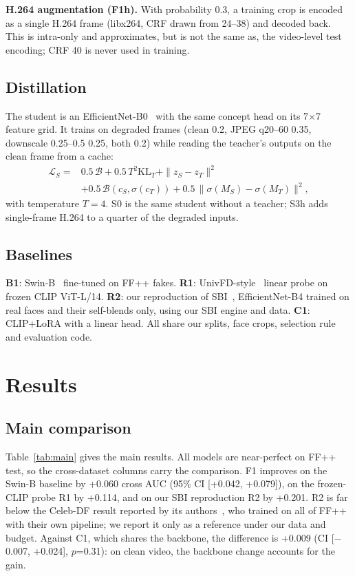 \documentclass[conference]{IEEEtran}
\begin{document}
\textbf{H.264 augmentation (F1h).} With probability 0.3, a training crop is encoded as a single H.264 frame
(libx264, CRF drawn from 24--38) and decoded back. This is intra-only and approximates, but is not the same as, the
video-level test encoding; CRF 40 is never used in training.

\subsection{Distillation}
The student is an EfficientNet-B0~\cite{efficientnet} with the same concept head on its 7$\times$7 feature grid. It
trains on degraded frames (clean 0.2, JPEG q20--60 0.35, downscale 0.25--0.5 0.25, both 0.2) while reading the
teacher's outputs on the clean frame from a cache:
\begin{align}
\mathcal{L}_S = {} & 0.5\,\mathcal{B} + 0.5\,T^2\mathrm{KL}_T + \|z_S-z_T\|^2 \nonumber\\
& + 0.5\,\mathcal{B}(c_S,\sigma(c_T)) + 0.5\,\|\sigma(M_S)-\sigma(M_T)\|^2,
\end{align}
with temperature $T=4$. S0 is the same student without a teacher; S3h adds single-frame H.264 to a quarter of the
degraded inputs.

\subsection{Baselines}
\textbf{B1}: Swin-B~\cite{swin} fine-tuned on FF++ fakes. \textbf{R1}: UnivFD-style~\cite{univfd} linear probe on
frozen CLIP ViT-L/14. \textbf{R2}: our reproduction of SBI~\cite{sbi}, EfficientNet-B4 trained on real faces and
their self-blends only, using our SBI engine and data. \textbf{C1}: CLIP+LoRA with a linear head. All share our
splits, face crops, selection rule and evaluation code.

\section{Results}\label{sec:results}



\subsection{Main comparison}
Table~\ref{tab:main} gives the main results. All models are near-perfect on FF++ test, so the cross-dataset
columns carry the comparison. F1 improves on the Swin-B baseline by +0.060 cross AUC (95\% CI [+0.042, +0.079]),
on the frozen-CLIP probe R1 by +0.114, and on our SBI reproduction R2 by +0.201. R2 is far below the Celeb-DF
result reported by its authors~\cite{sbi}, who trained on all of FF++ with their own pipeline; we report it only as
a reference under our data and budget. Against C1, which shares the backbone, the difference is +0.009
(CI [$-$0.007, +0.024], $p$=0.31): on clean video, the backbone change accounts for the gain.
\end{document}
